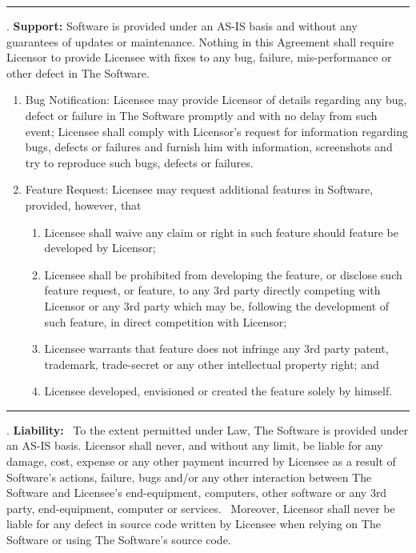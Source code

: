 \documentclass[oneside,openany,11pt,a4paper]{report}
\begin{document}
\noindent\rule{\textwidth}{0.5pt}
. \textbf{Support:} Software is provided under an AS-IS basis and without any guarantees of updates or maintenance. Nothing in this Agreement shall require Licensor to provide Licensee with fixes to any bug, failure, mis-performance or other defect in The Software.
\begin{enumerate}
	\item Bug Notification: Licensee may provide Licensor of details regarding any bug, defect or failure in The Software promptly and with no delay from such event; Licensee shall comply with Licensor's request for information regarding bugs, defects or failures and furnish him with information, screenshots and try to reproduce such bugs, defects or failures.
\item Feature Request: Licensee may request additional features in Software, provided, however, that 
\begin{enumerate} 
	\item Licensee shall waive any claim or right in such feature should feature be developed by Licensor; 
	\item Licensee shall be prohibited from developing the feature, or disclose such feature request, or feature, to any 3rd party directly competing with Licensor or any 3rd party which may be, following the development of such feature, in direct competition with Licensor; 
	\item Licensee warrants that feature does not infringe any 3rd party patent, trademark, trade-secret or any other intellectual property right; and 
	\item Licensee developed, envisioned or created the feature solely by himself.
\end{enumerate}
\end{enumerate}

\rule{\textwidth}{0.5pt}
. \textbf{Liability:}  To the extent permitted under Law, The Software is provided under an AS-IS basis. Licensor shall never, and without any limit, be liable for any damage, cost, expense or any other payment incurred by Licensee as a result of Software’s actions, failure, bugs and/or any other interaction between The Software and Licensee’s end-equipment, computers, other software or any 3rd party, end-equipment, computer or services.  Moreover, Licensor shall never be liable for any defect in source code written by Licensee when relying on The Software or using The Software’s source code.
\end{document}

